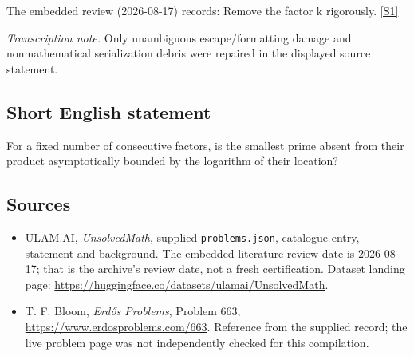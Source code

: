 \documentclass[11pt,a4paper]{article}
\newcommand{\sref}[2]{\hyperlink{source:#1:#2}{[S#2]}}
\begin{document}
The embedded review (2026-08-17) records: Remove the factor k rigorously. \sref{statement}{1}

{\small\emph{Transcription note.} Only unambiguous escape/formatting damage and nonmathematical serialization debris were repaired in the displayed source statement.}

\subsection{Short English statement}

For a fixed number of consecutive factors, is the smallest prime absent from their product asymptotically bounded by the logarithm of their location?

\subsection{Sources}

{\small

\begin{itemize}

\item[\hypertarget{source:statement:1}{S1}] ULAM.AI, \emph{UnsolvedMath}, supplied \texttt{problems.json}, catalogue entry, statement and background. The embedded literature-review date is 2026-08-17; that is the archive’s review date, not a fresh certification. Dataset landing page: \url{https://huggingface.co/datasets/ulamai/UnsolvedMath}.

\item[\hypertarget{source:statement:2}{S2}] T. F. Bloom, \emph{Erdős Problems}, Problem 663, \url{https://www.erdosproblems.com/663}. Reference from the supplied record; the live problem page was not independently checked for this compilation.

\end{itemize}

}

\label{end:statement}
\end{document}
